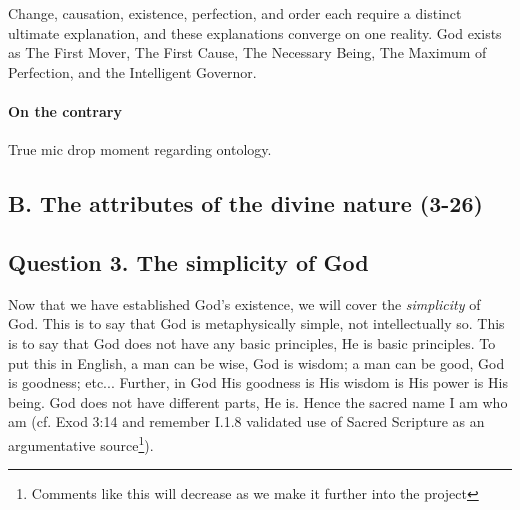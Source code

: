 \documentclass{ucetd}
\begin{document}
Change, causation, existence, perfection, and order each require a distinct ultimate explanation, and these explanations converge on one reality. God exists as The First Mover, The First Cause, The Necessary Being, The Maximum of Perfection, and the Intelligent Governor.

\paragraph{On the contrary}
True mic drop moment regarding ontology.


\subsection{B. The attributes of the divine nature (3-26)}
\subsection{Question 3. The simplicity of God}
Now that we have established God's existence, we will cover the \textit{simplicity} of God. This is to say that God is metaphysically simple, not intellectually so. This is to say that God does not have any basic principles, He is basic principles. To put this in English, a man can be wise, God is wisdom; a man can be good, God is goodness; etc... Further, in God His goodness is His wisdom is His power is His being. God does not have different parts, He is. Hence the sacred name I am who am (cf. Exod 3:14 and remember I.1.8 validated use of Sacred Scripture as an argumentative source\footnote{Comments like this will decrease as we make it further into the project}).
\end{document}
